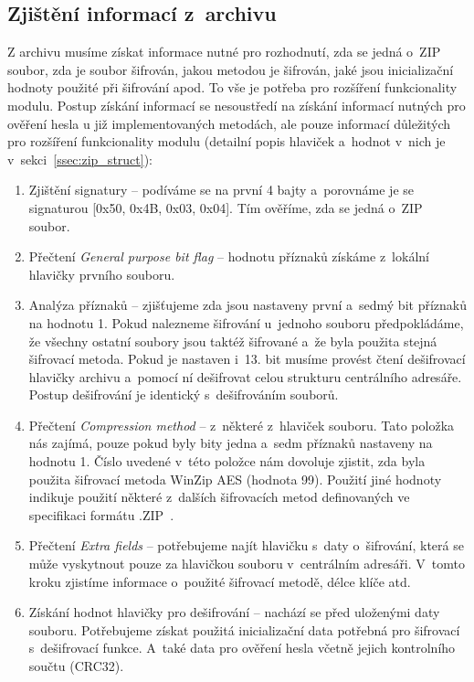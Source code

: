 \subsection{Zjištění informací z~archivu}
Z archivu musíme získat informace nutné pro rozhodnutí, zda se jedná o~ZIP soubor, zda je soubor
šifrován, jakou metodou je šifrován, jaké jsou inicializační hodnoty použité při šifrování apod. To
vše je potřeba pro rozšíření funkcionality modulu. Postup získání informací se nesoustředí na
získání informací nutných pro ověření hesla u již implementovaných metodách, ale pouze informací
důležitých pro rozšíření funkcionality modulu (detailní popis hlaviček a~hodnot v~nich je
v~sekci~\ref{ssec:zip_struct}):
\begin{enumerate}
    \item Zjištění signatury -- podíváme se na první 4 bajty a~porovnáme je se signaturou [0x50,
	0x4B, 0x03, 0x04]. Tím ověříme, zda se jedná o~ZIP soubor.
    \item Přečtení {\it General purpose bit flag} -- hodnotu příznaků získáme z~lokální hlavičky
	prvního souboru.
    \item Analýza příznaků -- zjišťujeme zda jsou nastaveny první a~sedmý bit příznaků na hodnotu
	1. Pokud nalezneme šifrování u~jednoho souboru předpokládáme, že všechny ostatní soubory
	jsou taktéž šifrované a~že byla použita stejná šifrovací metoda. Pokud je nastaven i~13.
	bit musíme provést čtení dešifrovací hlavičky archivu a~pomocí ní dešifrovat celou
	strukturu centrálního adresáře. Postup dešifrování je identický s~dešifrováním souborů.
    \item Přečtení {\it Compression method} -- z~některé z~hlaviček %
	souboru. Tato položka nás zajímá, pouze pokud byly bity jedna a~sedm příznaků nastaveny na
	hodnotu 1. Číslo uvedené v~této položce nám dovoluje zjistit, zda byla použita šifrovací
	metoda WinZip AES (hodnota 99). Použití jiné hodnoty indikuje použití některé z~dalších
	šifrovacích metod definovaných ve specifikaci formátu .ZIP~\cite{PKWARE:2014}.
    \item Přečtení {\it Extra fields} -- potřebujeme najít hlavičku s~daty o~šifrování, která se
	může vyskytnout pouze za hlavičkou souboru v~centrálním adresáři. V~tomto kroku zjistíme
	informace o~použité šifrovací metodě, délce klíče atd.
    \item Získání hodnot hlavičky pro dešifrování -- nachází se před uloženými daty souboru.
	Potřebujeme získat použitá inicializační data potřebná pro šifrovací s~dešifrovací funkce.
	A~také data pro ověření hesla včetně jejich kontrolního součtu (CRC32).
\end{enumerate}

